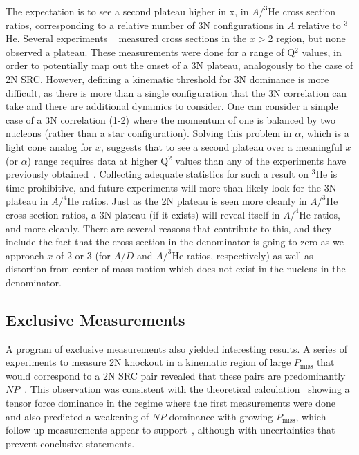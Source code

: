 The expectation is to see a second plateau higher in x, in $A/^3\mathrm{He}$ cross section ratios, corresponding to a relative number of 3N configurations in $A$ relative to $^3$He.  Several experiments ~\cite{PhysRevLett.96.082501, Fomin:2011ng, PhysRevC.97.065204}  measured cross sections in the $x>$2 region, but none observed a plateau.  These measurements were done for a range of Q$^2$ values, in order to potentially map out the onset of a 3N plateau, analogously to the case of 2N SRC.  However, defining a kinematic threshold for 3N dominance is more difficult, as there is more than a single configuration that the 3N correlation can take and there are additional dynamics to consider.  One can consider a simple case of a 3N correlation (1-2) where the momentum of one is balanced by two nucleons (rather than a star configuration).  Solving this problem in $\alpha$, which is a light cone analog for $x$, suggests that to see a second plateau over a meaningful $x$ (or $\alpha$) range requires data at higher Q$^2$ values than any of the experiments have previously obtained~\cite{Fomin:2017ydn}.  Collecting adequate statistics for such a result on $^3$He is time prohibitive, and future experiments will more than likely look for the 3N plateau in $A/^4\mathrm{He}$ ratios.  Just as the 2N plateau is seen more cleanly in $A/^3\mathrm{He}$ cross section ratios, a 3N plateau (if it exists) will reveal itself in  $A/^4\mathrm{He}$ ratios, and more cleanly.  There are several reasons that contribute to this, and they include the fact that the cross section in the denominator is going to zero as we approach $x$ of 2 or 3 (for $A/D$ and $A/^3\mathrm{He}$ ratios, respectively) as well as distortion from center-of-mass motion which does not exist in the nucleus in the denominator. 

\subsection{Exclusive Measurements}
A program of exclusive measurements also yielded interesting results. A series of experiments to measure 2N knockout in a kinematic region of large $P_\mathrm{miss}$ that would correspond to a 2N SRC pair revealed that these pairs are predominantly $NP$~\cite{Subedi:2008zz, Shneor:2007tu}.  This observation was consistent with the theoretical calculation~\cite{Schiavilla:2006xx} showing a tensor force dominance in the regime where the first measurements were done and also predicted a weakening of $NP$ dominance with growing $P_\mathrm{miss}$, which follow-up measurements appear to support~\cite{Korover:2014dma}, although with uncertainties that prevent conclusive statements. 


